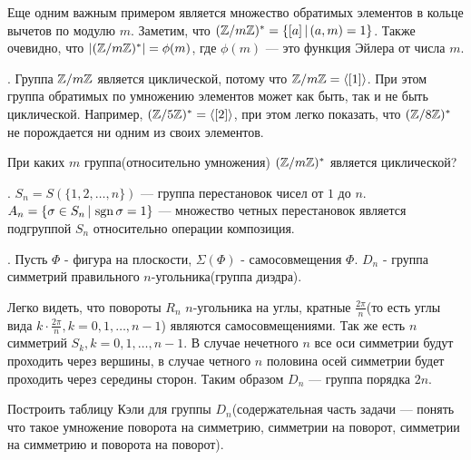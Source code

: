 \documentclass[../main.tex]{subfiles}
\begin{document}
Еще одним важным примером является множество обратимых элементов в кольце вычетов по модулю $m$. Заметим, что $(\mathbb{Z}/m\mathbb{Z})^{*} = \{[a] \, | \, (a, m) = 1\}$. Также очевидно, что $|(\mathbb{Z}/m\mathbb{Z})^{*}| = \phi(m)$, где $\phi(m)$ --- это функция Эйлера от числа $m$.

. Группа $\mathbb{Z}/m\mathbb{Z}$ является циклической, потому что $\mathbb{Z}/m\mathbb{Z} = \langle[1]\rangle$. При этом группа обратимых по умножению элементов может как быть, так и не быть циклической. Например, $(\mathbb{Z}/5\mathbb{Z})^{*} = \langle[2]\rangle$, при этом легко показать, что $(\mathbb{Z}/8\mathbb{Z})^{*}$ не порождается ни одним из своих элементов.

\begin{exercise}
    При каких $m$ группа(относительно умножения) $(\mathbb{Z}/m\mathbb{Z})^{*}$ является циклической?
\end{exercise}

\textbf{}. $S_n = S(\{1, 2, \dotsc, n\})$ --- группа перестановок чисел от $1$ до $n$. $A_n = \{\sigma \in S_n \, | \, \operatorname{sgn} \sigma = 1\}$ --- множество четных перестановок является подгруппой $S_n$ относительно операции композиция.

\textbf{}. Пусть $\Phi$ - фигура на плоскости, $\Sigma(\Phi)$ - самосовмещения $\Phi$. $D_n$ - группа симметрий правильного $n$-угольника(группа диэдра).

\begin{center}
\end{center}
Легко видеть, что повороты $R_n$ $n$-угольника на углы, кратные $\frac{2\pi}{n}$(то есть углы вида $k \cdot \frac{2\pi}{n}, k = 0, 1, \dotsc, n - 1$) являются самосовмещениями. Так же есть $n$ симметрий $S_k, k = 0, 1, \dotsc, n - 1$. В случае нечетного $n$ все оси симметрии будут проходить через вершины, в случае четного $n$ половина осей симметрии будет проходить через середины сторон. Таким образом $D_n$ --- группа порядка $2n$.
\begin{exercise}
    Построить таблицу Кэли для группы $D_n$(содержательная часть задачи --- понять что такое умножение поворота на симметрию, симметрии на поворот, симметрии на симметрию и поворота на поворот).
\end{exercise}
\end{document}
